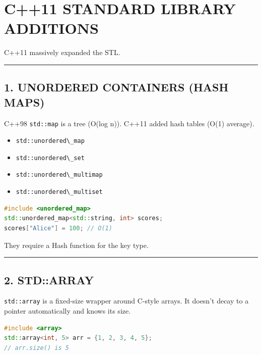 \hypertarget{c11-standard-library-additions}{%
\chapter{C++11 STANDARD LIBRARY
ADDITIONS}\label{c11-standard-library-additions}}

C++11 massively expanded the STL.

\begin{center}\rule{0.5\linewidth}{0.5pt}\end{center}

\hypertarget{unordered-containers-hash-maps}{%
\section{1. UNORDERED CONTAINERS (HASH
MAPS)}\label{unordered-containers-hash-maps}}

C++98 \passthrough{\lstinline!std::map!} is a tree (O(log n)). C++11
added hash tables (O(1) average).

\begin{itemize}
\tightlist
\item
  \passthrough{\lstinline!std::unordered\_map!}
\item
  \passthrough{\lstinline!std::unordered\_set!}
\item
  \passthrough{\lstinline!std::unordered\_multimap!}
\item
  \passthrough{\lstinline!std::unordered\_multiset!}
\end{itemize}

\begin{lstlisting}[language={C++}]
#include <unordered_map>
std::unordered_map<std::string, int> scores;
scores["Alice"] = 100; // O(1)
\end{lstlisting}

They require a Hash function for the key type.

\begin{center}\rule{0.5\linewidth}{0.5pt}\end{center}

\hypertarget{stdarray}{%
\section{2. STD::ARRAY}\label{stdarray}}

\passthrough{\lstinline!std::array!} is a fixed-size wrapper around
C-style arrays. It doesn't decay to a pointer automatically and knows
its size.

\begin{lstlisting}[language={C++}]
#include <array>
std::array<int, 5> arr = {1, 2, 3, 4, 5};
// arr.size() is 5
\end{lstlisting}

